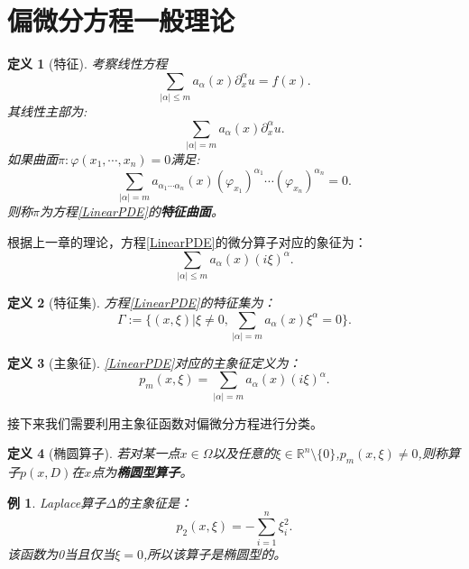 \documentclass[a4paper]{ctexart}
\newtheorem{Definition}{\hspace{2em}定义}[section]
\newtheorem{Example}{\hspace{2em}例}[section]
\newcommand{\Rn}{\mathbb{R}^{n}}
\begin{document}
\section{偏微分方程一般理论}
\begin{Definition}[特征]
    考察线性方程
    \begin{equation}
        \label{LinearPDE}
        \sum_{|\alpha|\le m}a_{\alpha}(x)\partial_{x}^{\alpha}u=f(x).
    \end{equation}
    其线性主部为:
    \begin{equation}
        \sum_{|\alpha|=m}a_{\alpha}(x)\partial_{x}^{\alpha}u.
    \end{equation}
    如果曲面$\pi:\varphi(x_{1},\cdots,x_{n})=0$满足:
    \begin{equation}
        \sum_{|\alpha|=m}a_{\alpha_{1}\cdots\alpha_{n}}(x)(\varphi_{x_{1}})^{\alpha_{1}}\cdots(\varphi_{x_{n}})^{\alpha_{n}}=0.
    \end{equation}
    则称$\pi$为方程\eqref{LinearPDE}的\textbf{特征曲面}。
\end{Definition}
根据上一章的理论，方程\eqref{LinearPDE}的微分算子对应的象征为：
\begin{equation}
    \sum_{|\alpha|\le m}a_{\alpha}(x)(i\xi)^{\alpha}.
\end{equation}
\begin{Definition}[特征集]
    方程\eqref{LinearPDE}的特征集为：
    \begin{equation}
        \varGamma:=\{(x,\xi)|\xi\neq 0,\sum_{|\alpha|=m}a_{\alpha}(x)\xi^{\alpha}=0\}.
    \end{equation}
\end{Definition}
\begin{Definition}[主象征]
    \eqref{LinearPDE}对应的主象征定义为：
    \begin{equation}
        p_{m}(x,\xi)=\sum_{|\alpha|=m}a_{\alpha}(x)(i\xi)^{\alpha}.
    \end{equation}
\end{Definition}
接下来我们需要利用主象征函数对偏微分方程进行分类。
\begin{Definition}[椭圆算子]
    若对某一点$x\in\Omega$以及任意的$\xi\in\Rn\setminus\{0\}$,$p_{m}(x,\xi)\neq 0$,则称算子$p(x,D)$在$x$点为\textbf{椭圆型算子}。
\end{Definition}
\begin{Example}
    Laplace算子$\varDelta$的主象征是：
    \begin{equation}
        p_{2}(x,\xi)=-\sum_{i=1}^{n}\xi_{i}^{2}.
    \end{equation}
    该函数为0当且仅当$\xi=0$,所以该算子是椭圆型的。
\end{Example}
\end{document}
